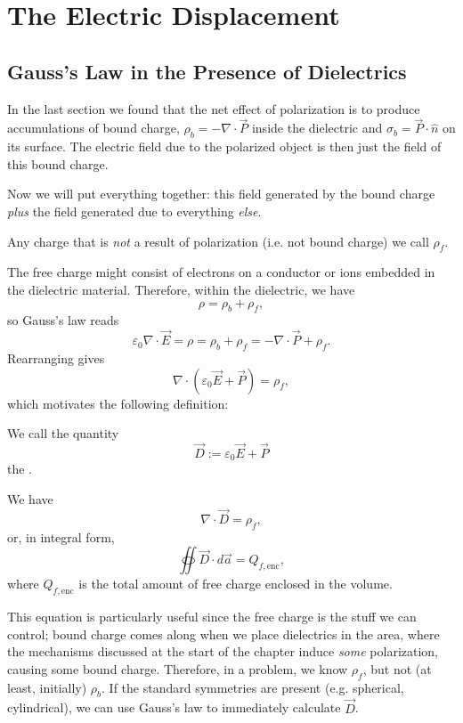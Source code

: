 \section{The Electric Displacement}\label{electricdisplacement}

\subsection{Gauss's Law in the Presence of Dielectrics}

In the last section we found that the net effect of polarization is to produce accumulations of bound charge, $\rho_b=-\nabla\cdot \vec{P}$ inside the dielectric and $\sigma_b=\vec{P}\cdot\hat{n}$ on its surface. The electric field due to the polarized object is then just the field of this bound charge.

Now we will put everything together: this field generated by the bound charge \textit{plus} the field generated due to everything \textit{else}.

\begin{definition}
Any charge that is \textit{not} a result of polarization (i.e. not bound charge) we call  $\rho_f$.
\end{definition}

The free charge might consist of electrons on a conductor or ions embedded in the dielectric material. Therefore, within the dielectric, we have
\[\rho=\rho_b+\rho_f,\]
so Gauss's law reads
\[\varepsilon_0\nabla\cdot \vec{E}=\rho=\rho_b+\rho_f=-\nabla\cdot \vec{P}+\rho_f.\]
Rearranging gives 
\[\nabla\cdot(\varepsilon_0\vec{E}+\vec{P})=\rho_f,\]
which motivates the following definition:
\begin{definition}
We call the quantity 
\[\vec{D}:=\varepsilon_0\vec{E}+\vec{P}\]
the .
\end{definition}

\begin{theorem}
We have
\[\nabla\cdot \vec{D}=\rho_f,\]
or, in integral form,
\[\oiint \vec{D}\cdot d\vec{a}=Q_{f,\text{enc}},\]
where $Q_{f,\text{enc}}$ is the total amount of free charge enclosed in the volume.
\end{theorem}

This equation is particularly useful since the free charge is the stuff we can control; bound charge comes along when we place dielectrics in the area, where the mechanisms discussed at the start of the chapter induce \textit{some} polarization, causing some bound charge. Therefore, in a problem, we know $\rho_f$, but not (at least, initially) $\rho_b$. If the standard symmetries are present (e.g. spherical, cylindrical), we can use Gauss's law to immediately calculate $\vec{D}$.

